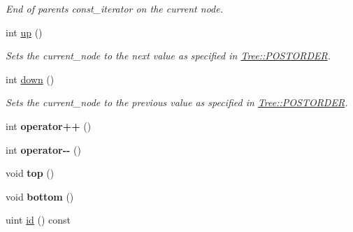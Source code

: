 \begin{DoxyCompactItemize}
\begin{DoxyCompactList}\small\item\em End of parents {\ttfamily const\+\_\+iterator} on the current node. \end{DoxyCompactList}\item 
int \hyperlink{classTreeIterator_adca1d999f093a69e2f5d044b358e5da7}{up} ()\hypertarget{classTreeIterator_adca1d999f093a69e2f5d044b358e5da7}{}\label{classTreeIterator_adca1d999f093a69e2f5d044b358e5da7}

\begin{DoxyCompactList}\small\item\em Sets the {\ttfamily current\+\_\+node} to the next value as specified in \hyperlink{classTree_a310e76b803db38e7067514822b21a58f}{Tree\+::\+P\+O\+S\+T\+O\+R\+D\+ER}. \end{DoxyCompactList}\item 
int \hyperlink{classTreeIterator_a8534adba213df8f7f1e67bf5005d902e}{down} ()\hypertarget{classTreeIterator_a8534adba213df8f7f1e67bf5005d902e}{}\label{classTreeIterator_a8534adba213df8f7f1e67bf5005d902e}

\begin{DoxyCompactList}\small\item\em Sets the {\ttfamily current\+\_\+node} to the previous value as specified in \hyperlink{classTree_a310e76b803db38e7067514822b21a58f}{Tree\+::\+P\+O\+S\+T\+O\+R\+D\+ER}. \end{DoxyCompactList}\item 
int {\bfseries operator++} ()\hypertarget{classTreeIterator_aed2ad905c7c0cef8c2fd8e012c67dc5c}{}\label{classTreeIterator_aed2ad905c7c0cef8c2fd8e012c67dc5c}

\item 
int {\bfseries operator-\/-\/} ()\hypertarget{classTreeIterator_a08d18c38de3157a78b9d02899a605ed8}{}\label{classTreeIterator_a08d18c38de3157a78b9d02899a605ed8}

\item 
void {\bfseries top} ()\hypertarget{classTreeIterator_a41f74b1ac47cd05ce7e08b46c93034f1}{}\label{classTreeIterator_a41f74b1ac47cd05ce7e08b46c93034f1}

\item 
void {\bfseries bottom} ()\hypertarget{classTreeIterator_a1c8244cded3c2a573d2914549a19e177}{}\label{classTreeIterator_a1c8244cded3c2a573d2914549a19e177}

\item 
uint \hyperlink{classTreeIterator_a80badcbb276e0aa78216f5ef6ff91b62}{id} () const \hypertarget{classTreeIterator_a80badcbb276e0aa78216f5ef6ff91b62}{}\label{classTreeIterator_a80badcbb276e0aa78216f5ef6ff91b62}


\end{DoxyCompactItemize}

